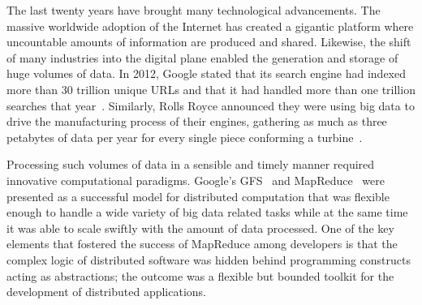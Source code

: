 \label{ch:introduction}




The last twenty years have brought many technological advancements. The massive worldwide adoption of the Internet has created a gigantic platform where uncountable amounts of information are produced and shared. Likewise, the shift of many industries into the digital plane enabled the generation and storage of huge volumes of data. In 2012, Google stated that its search engine had indexed more than 30 trillion unique URLs and that it had handled more than one trillion searches that year~\cite{WebGoogleZeitgeist2017}. Similarly, Rolls Royce announced they were using big data to drive the manufacturing process of their engines, gathering as much as three petabytes of data per year for every single piece conforming a turbine~\cite{WebForbes2017,WebRollsRoyce2017}.


Processing such volumes of data in a sensible and timely manner required innovative computational paradigms. Google's GFS~\cite{Ghemawat2003} and MapReduce~\cite{Dean2008} were presented as a successful model for distributed computation that was flexible enough to handle a wide variety of big data related tasks while at the same time it was able to scale swiftly with the amount of data processed. One of the key elements that fostered the success of MapReduce among developers is that the complex logic of distributed software was hidden behind programming constructs acting as abstractions; the outcome was a flexible but bounded toolkit for the development of distributed applications.

